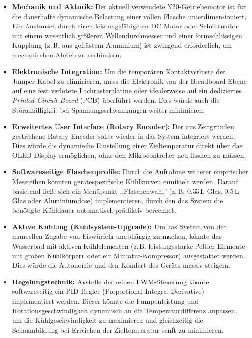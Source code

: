 \begin{itemize}
	\item \textbf{Mechanik und Aktorik:} Der aktuell verwendete N20-Getriebemotor ist für die dauerhafte dynamische Belastung einer vollen Flasche unterdimensioniert. Ein Austausch durch einen leistungsfähigeren DC-Motor oder Schrittmotor mit einem wesentlich größeren Wellendurchmesser und einer formschlüssigen Kupplung (z.\,B. aus gefrästem Aluminium) ist zwingend erforderlich, um mechanischen Abrieb zu verhindern.
	
	\item \textbf{Elektronische Integration:} Um die temporären Kontaktverluste der Jumper-Kabel zu eliminieren, muss die Elektronik von der Breadboard-Ebene auf eine fest verlötete Lochrasterplatine oder idealerweise auf ein dediziertes \textit{Printed Circuit Board} (PCB) überführt werden. Dies würde auch die Störanfälligkeit bei Spannungsschwankungen weiter minimieren.
	
	\item \textbf{Erweitertes User Interface (Rotary Encoder):} Der aus Zeitgründen gestrichene Rotary Encoder sollte wieder in das System integriert werden. Dies würde die dynamische Einstellung einer Zieltemperatur direkt über das OLED-Display ermöglichen, ohne den Mikrocontroller neu flashen zu müssen.
	
	\item \textbf{Softwareseitige Flaschenprofile:} Durch die Aufnahme weiterer empirischer Messreihen könnten gerätespezifische Kühlkurven ermittelt werden. Darauf basierend ließe sich ein Menüpunkt ,,Flaschenwahl'' (z.\,B. 0,33\,L Glas, 0,5\,L Glas oder Aluminiumdose) implementieren, durch den das System die benötigte Kühldauer automatisch prädiktiv berechnet.
	
	\item \textbf{Aktive Kühlung (Kühlsystem-Upgrade):} Um das System von der manuellen Zugabe von Eiswürfeln unabhängig zu machen, könnte das Wasserbad mit aktiven Kühlelementen (z.\,B. leistungsstarke Peltier-Elemente mit großen Kühlkörpern oder ein Miniatur-Kompressor) ausgestattet werden. Dies würde die Autonomie und den Komfort des Geräts massiv steigern.
	
	\item \textbf{Regelungstechnik:} Anstelle der reinen PWM-Steuerung könnte softwareseitig ein PID-Regler (Proportional-Integral-Derivative) implementiert werden. Dieser könnte die Pumpenleistung und Rotationsgeschwindigkeit dynamisch an die Temperaturdifferenz anpassen, um die Kühlgeschwindigkeit zu maximieren und gleichzeitig die Schaumbildung bei Erreichen der Zieltemperatur sanft zu minimieren.
\end{itemize}